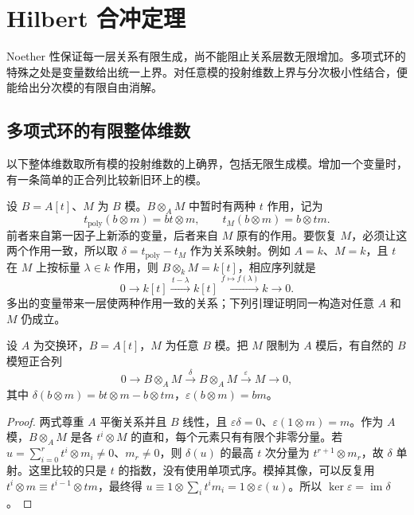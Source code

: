 
\section{Hilbert 合冲定理}
\label{b3:sec:2102}


%
%
%

Noether 性保证每一层关系有限生成，尚不能阻止关系层数无限增加。多项式环的特殊之处是变量数给出统一上界。对任意模的投射维数上界与分次极小性结合，便能给出分次模的有限自由消解。

\subsection{多项式环的有限整体维数}
\label{b3:subsec:2102:01}

以下整体维数取所有模的投射维数的上确界，包括无限生成模。增加一个变量时，有一条简单的正合列比较新旧环上的模。

\ProseParagraphBreak
设 \(B=A[t]\)、\(M\) 为 \(B\) 模。\(B\otimes_AM\) 中暂时有两种 \(t\) 作用，记为
\[
	t_{\mathrm{poly}}(b\otimes m)=bt\otimes m, \qquad t_M(b\otimes m)=b\otimes tm.
\]
前者来自第一因子上新添的变量，后者来自 \(M\) 原有的作用。要恢复 \(M\)，必须让这两个作用一致，所以取 \(\delta=t_{\mathrm{poly}}-t_M\) 作为关系映射。例如 \(A=k\)、\(M=k\)，且 \(t\) 在 \(M\) 上按标量 \(\lambda\in k\) 作用，则 \(B\otimes_kM=k[t]\)，相应序列就是
\[
	0\longrightarrow k[t]\xrightarrow{\,t-\lambda\,}k[t] \xrightarrow{f\mapsto f(\lambda)}k\longrightarrow0.
\]
多出的变量带来一层使两种作用一致的关系；下列引理证明同一构造对任意 \(A\) 和 \(M\) 仍成立。

\begin{lemma}\label{b3:lem:polynomial-module-sequence}
	设 \(A\) 为交换环，\(B=A[t]\)，\(M\) 为任意 \(B\) 模。把 \(M\) 限制为 \(A\) 模后，有自然的 \(B\) 模短正合列
	\[
		0\longrightarrow B\otimes_AM\xrightarrow{\delta}B\otimes_AM \xrightarrow{\varepsilon}M\longrightarrow0,
	\]
	其中 \(\delta(b\otimes m)=bt\otimes m-b\otimes tm\)，\(\varepsilon(b\otimes m)=bm\)。
\end{lemma}
\begin{proof}
	两式尊重 \(A\) 平衡关系并且 \(B\) 线性，且 \(\varepsilon\delta=0\)、\(\varepsilon(1\otimes m)=m\)。作为 \(A\) 模，\(B\otimes_AM\) 是各 \(t^i\otimes M\) 的直和，每个元素只有有限个非零分量。若 \(u=\sum_{i=0}^rt^i\otimes m_i\ne0\)、\(m_r\ne0\)，则 \(\delta(u)\) 的最高 \(t\) 次分量为 \(t^{r+1}\otimes m_r\)，故 \(\delta\) 单射。这里比较的只是 \(t\) 的指数，没有使用单项式序。模掉其像，可以反复用 \(t^i\otimes m\equiv t^{i-1}\otimes tm\)，最终得 \(u\equiv1\otimes\sum_i t^im_i=1\otimes\varepsilon(u)\)。所以 \(\ker\varepsilon=\operatorname{im}\delta\)。
\end{proof}

